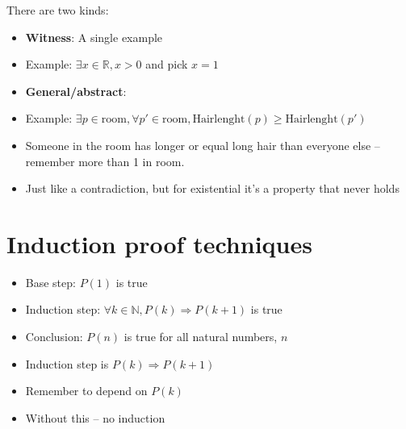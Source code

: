 \documentclass[english,10pt,a4paper]{article}
\begin{document}
\begin{theo} 
 There are two kinds:
\begin{itemize}
\item \textbf{Witness}: A single example
\item[] Example: $\exists x \in \mathbb{R}, x > 0$ and pick $x=1$
\item \textbf{General/abstract}: 
\item[] Example: $\exists p \in \text{room}, \forall p' \in \text{room}, \text{Hairlenght}(p) \geq \text{Hairlenght}(p')$
\item[] Someone in the room has longer or equal long hair than everyone else -- remember more than 1 in room.
\end{itemize}
\end{theo}


\begin{theo} 
\begin{itemize}
\item Just like a contradiction, but for existential it's a property that never holds
\end{itemize}
\end{theo}



\newpage
\section{Induction proof techniques}

\begin{theo}[Basic] 
\begin{itemize}
\item Base step: $P(1)$ is true
\item Induction step: $\forall k \in \mathbb{N}, P(k) \Rightarrow P(k+1)$ is true
\item Conclusion: $P(n)$ is true for all natural numbers, $n$
\end{itemize}
\end{theo}


\begin{theo} 
\begin{itemize}
\item Induction step is $P(k) \Rightarrow P(k+1)$
\item Remember to depend on $P(k)$
\item Without this -- no induction
\end{itemize}
\end{theo}
\end{document}
